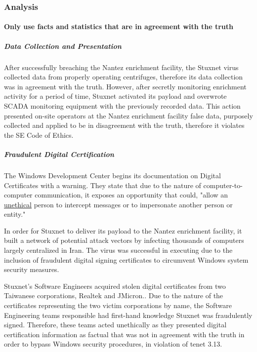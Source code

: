 \documentclass[12pt]{article}
\begin{document}
\begin{multicols}{2}
\subsubsection{Analysis}

\paragraph{Only use facts and statistics that are in agreement with the truth}

\subparagraph{Data Collection and Presentation}

After successfully breaching the Nantez enrichment facility, the Stuxnet virus collected data from properly operating centrifuges, therefore its data collection was in agreement with the truth. However, after secretly monitoring enrichment activity for a period of time, Stuxnet activated its payload and overwrote SCADA monitoring equipment with the previously recorded data.\cite{toKillACentrifuge} This action presented on-site operators at the Nantez enrichment facility false data, purposely collected and applied to be in disagreement with the truth, therefore it violates the SE Code of Ethics.

\subparagraph{Fraudulent Digital Certification}

The Windows Development Center begins its documentation on Digital Certificates with a warning. They state that due to the nature of computer-to-computer communication, it exposes an opportunity that could, "allow an \ul{unethical} person to intercept messages or to impersonate another person or entity."\cite{moreOnDigitalCertificates}

In order for Stuxnet to deliver its payload to the Nantez enrichment facility, it built a network of potential attack vectors by infecting thousands of computers largely centralized in Iran.\cite{lessonsFromStuxnet} The virus was successful in executing due to the inclusion of fraudulent digital signing certificates to circumvent Windows system security measures.

Stuxnet's Software Engineers acquired stolen digital certificates from two Taiwanese corporations, Realtek and JMicron.\cite{signedUsingCertificates}. Due to the nature of the certificates representing the two victim corporations by name, the Software Engineering teams responsible had first-hand knowledge Stuxnet was fraudulently signed. Therefore, these teams acted unethically as they presented digital certification information as factual that was not in agreement with the truth in order to bypass Windows security procedures, in violation of tenet 3.13.


\end{multicols}
\end{document}
